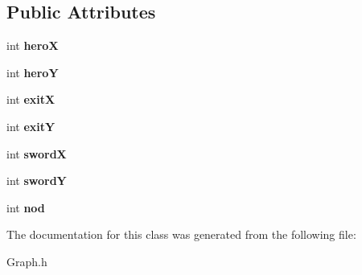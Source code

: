 \subsection*{Public Attributes}
\begin{DoxyCompactItemize}
\item 
\hypertarget{class_graph_ae0036365e4e2e14437c0dfbb71128416}{int {\bfseries hero\-X}}\label{class_graph_ae0036365e4e2e14437c0dfbb71128416}

\item 
\hypertarget{class_graph_a1182e54407da7f880bc6063aa0359294}{int {\bfseries hero\-Y}}\label{class_graph_a1182e54407da7f880bc6063aa0359294}

\item 
\hypertarget{class_graph_a945e7e47257752cd727084301faa2eea}{int {\bfseries exit\-X}}\label{class_graph_a945e7e47257752cd727084301faa2eea}

\item 
\hypertarget{class_graph_aca031817228c0ca61535acb192c9d30d}{int {\bfseries exit\-Y}}\label{class_graph_aca031817228c0ca61535acb192c9d30d}

\item 
\hypertarget{class_graph_ab14eb21364b7ce0619846da016679daf}{int {\bfseries sword\-X}}\label{class_graph_ab14eb21364b7ce0619846da016679daf}

\item 
\hypertarget{class_graph_ad409e5ac58a042fe71dd425025feb4c6}{int {\bfseries sword\-Y}}\label{class_graph_ad409e5ac58a042fe71dd425025feb4c6}

\item 
\hypertarget{class_graph_acc1c33526fcabe10dba0cb02d7f64a9a}{int {\bfseries nod}}\label{class_graph_acc1c33526fcabe10dba0cb02d7f64a9a}

\end{DoxyCompactItemize}


The documentation for this class was generated from the following file\-:\begin{DoxyCompactItemize}
\item 
Graph.\-h\end{DoxyCompactItemize}

